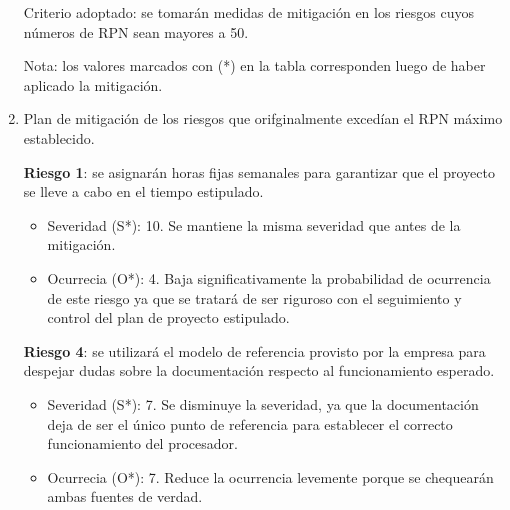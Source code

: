 \begin{enumerate}[label=\alph*)]
  Criterio adoptado: se tomarán medidas de mitigación en los riesgos cuyos números de RPN sean mayores a 50.

  Nota: los valores marcados con (*) en la tabla corresponden luego de haber aplicado la mitigación.

\item Plan de mitigación de los riesgos que orifginalmente excedían el RPN máximo establecido.

  \textbf{Riesgo 1}: se asignarán horas fijas semanales para garantizar que el proyecto se lleve a cabo en
  el tiempo estipulado.

  \begin{itemize}
  \item Severidad (S*): 10. Se mantiene la misma severidad que antes de la mitigación.
  \item Ocurrecia (O*): 4. Baja significativamente la probabilidad de ocurrencia de este riesgo ya
que se tratará de ser riguroso con el seguimiento y control del plan de proyecto estipulado.
  \end{itemize}

  \textbf{Riesgo 4}: se utilizará el modelo de referencia provisto por la empresa para despejar dudas sobre la documentación respecto al funcionamiento esperado.

  \begin{itemize}
  \item Severidad (S*): 7. Se disminuye la severidad, ya que la documentación deja de ser el único punto de referencia para establecer el correcto funcionamiento del procesador.
  \item Ocurrecia (O*): 7. Reduce la ocurrencia levemente porque se chequearán ambas fuentes de verdad.
  \end{itemize}

\end{enumerate}

